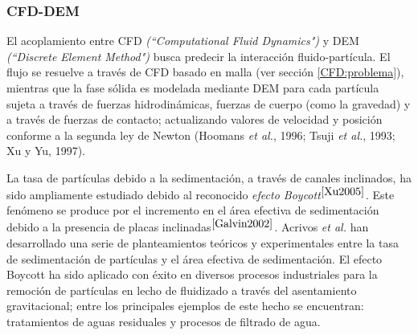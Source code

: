 \subsubsection{CFD-DEM}

\noindent
\justify

El acoplamiento entre CFD \textit{(``Computational Fluid Dynamics")} y DEM \textit{(``Discrete Element Method")} busca predecir la interacci\'on fluido-part\'icula. El flujo se resuelve a trav\'es de CFD basado en malla (ver secci\'on \ref{CFD:problema}), mientras que la fase s\'olida es modelada mediante DEM para cada part\'icula sujeta a trav\'es de fuerzas hidrodin\'amicas, fuerzas de cuerpo (como la gravedad) y a trav\'es de fuerzas de contacto; actualizando valores de velocidad y posici\'on conforme a la segunda ley de Newton (Hoomans \textit{et al.}, 1996; Tsuji \textit{et al.}, 1993; Xu y Yu, 1997). 

\noindent
\justify

La tasa de part\'iculas debido a la sedimentaci\'on, a trav\'es de canales inclinados, ha sido ampliamente estudiado debido al reconocido \textit{efecto Boycott}$^{\cite{Xu2005}}$. Este fen\'omeno se produce por el incremento en el \'area efectiva de sedimentaci\'on debido a la presencia de placas inclinadas$^{\cite{Galvin2002}}$. Acrivos \textit{et al.} han desarrollado una serie de planteamientos te\'oricos y experimentales entre la tasa de sedimentaci\'on de part\'iculas y el \'area efectiva de sedimentaci\'on. El efecto Boycott ha sido aplicado con \'exito en diversos procesos industriales para la remoci\'on de part\'iculas en lecho de fluidizado a trav\'es del asentamiento gravitacional; entre los principales ejemplos de este hecho se encuentran: tratamientos de aguas residuales y procesos de filtrado de agua.

\noindent
\justify

